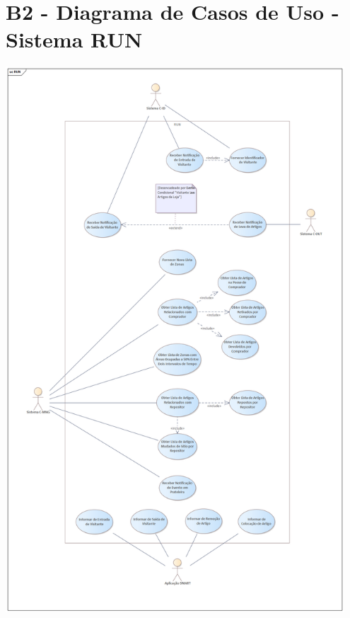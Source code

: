 \documentclass{article}
\begin{document}
\section*{B2 - Diagrama de Casos de Uso - Sistema RUN}
\vspace*{\fill}
\begin{center}
	\includegraphics[width=0.95\textwidth,height=0.95\textheight,keepaspectratio]{B2-RUN}
\end{center}
\vspace*{\fill}

\pagebreak
\end{document}
